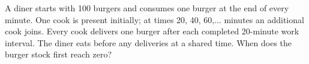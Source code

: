 A diner starts with 100 burgers and consumes one burger at the end of every minute. One cook is present initially; at times 20, 40, 60,... minutes an additional cook joins. Every cook delivers one burger after each completed 20-minute work interval. The diner eats before any deliveries at a shared time. When does the burger stock first reach zero?

